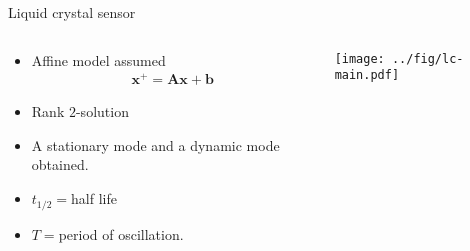 \documentclass[10pt]{beamer}
\newcommand\blfootnote[1]{%
  \begingroup
  \renewcommand\thefootnote{}\footnote{#1}%
  \addtocounter{footnote}{-1}%
  \endgroup
}
\newcommand{\bx}{\mathbf{x}}
\newcommand{\bA}{\mathbf{A}}
\newcommand{\bb}{\mathbf{b}}
\begin{document}
\begin{frame}{Liquid crystal sensor}
  \centering
  \begin{columns}
    \begin{column}{0.35\textwidth}
      \begin{itemize}
      \item Affine model assumed
        \begin{align*}
          \bx^+ = \bA\bx+\bb
        \end{align*}
      \item Rank $2$-solution
        \vspace{0.1in}
      \item A stationary mode and a dynamic mode obtained.
        \vspace{0.1in}
      \item $t_{1/2}=$half life
        \vspace{0.1in}
      \item $T=$period of oscillation.
      \end{itemize}
    \end{column}
    \begin{column}{0.65\textwidth}
  \texttt{[image: ../fig/lc-main.pdf]}
    \end{column}
  \end{columns}
\end{frame}



\end{document}

